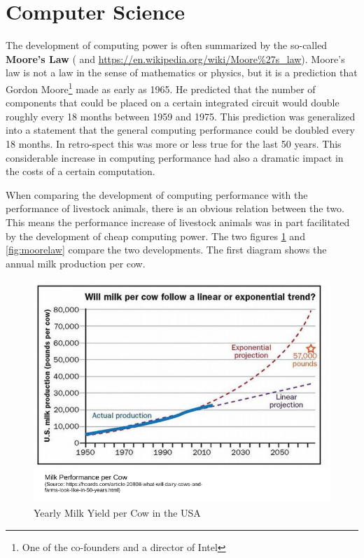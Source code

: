 \documentclass[
]{book}
\theoremstyle{definition}
\theoremstyle{definition}
\theoremstyle{definition}
\theoremstyle{remark}
\begin{document}
\hypertarget{computerscience}{%
\section{Computer Science}\label{computerscience}}

The development of computing power is often summarized by the so-called \textbf{Moore's Law} (\citep{Moore1965} and \url{https://en.wikipedia.org/wiki/Moore\%27s_law}). Moore's law is not a law in the sense of mathematics or physics, but it is a prediction that Gordon Moore\footnote{One of the co-founders and a director of Intel} made as early as 1965. He predicted that the number of components that could be placed on a certain integrated circuit would double roughly every 18 months between 1959 and 1975. This prediction was generalized into a statement that the general computing performance could be doubled every 18 months. In retro-spect this was more or less true for the last 50 years. This considerable increase in computing performance had also a dramatic impact in the costs of a certain computation.

When comparing the development of computing performance with the performance of livestock animals, there is an obvious relation between the two. This means the performance increase of livestock animals was in part facilitated by the development of cheap computing power. The two figures \ref{fig:milkcompperf} and \ref{fig:moorelaw} compare the two developments. The first diagram shows the annual milk production per cow.

\begin{figure}[!ht]
\includegraphics[width=7.42in,]{odg/milkcompperf} \caption{Yearly Milk Yield per Cow in the USA}\label{fig:milkcompperf}
\end{figure}
\end{document}
